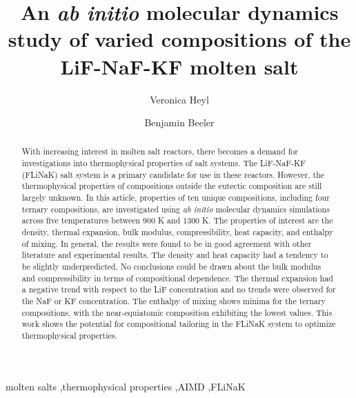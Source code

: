 \documentclass[preprint,12pt]{elsarticle}
\begin{document}
\begin{frontmatter}



\title{An \textit{ab initio} molecular dynamics study of varied compositions of the LiF-NaF-KF molten salt}
\author[inst1]{Veronica Heyl}


\author[inst1,inst2]{Benjamin Beeler}


\begin{abstract}

With increasing interest in molten salt reactors, there becomes a demand for investigations into thermophysical properties of salt systems. The LiF-NaF-KF (FLiNaK) salt system is a primary candidate for use in these reactors. However, the thermophysical properties of compositions outside the eutectic composition are still largely unknown. In this article, properties of ten unique compositions, including four ternary compositions, are investigated using \textit{ab initio} molecular dynamics simulations across five temperatures between 900 K and 1300 K. The properties of interest are the density, thermal expansion, bulk modulus, compressibility, heat capacity, and enthalpy of mixing. In general, the results were found to be in good agreement with other literature and experimental results. The density and heat capacity had a tendency to be slightly underpredicted. No conclusions could be drawn about the bulk modulus and compressibility in terms of compositional dependence. The thermal expansion had a negative trend with respect to the LiF concentration and no trends were observed for the NaF or KF concentration. The enthalpy of mixing shows minima for the ternary compositions, with the near-equiatomic composition exhibiting the lowest values. This work shows the potential for compositional tailoring in the FLiNaK system to optimize thermophysical properties.

\end{abstract}



\begin{keyword}
molten salts \sep thermophysical properties \sep AIMD \sep FLiNaK
\end{keyword}

\end{frontmatter}
\end{document}

